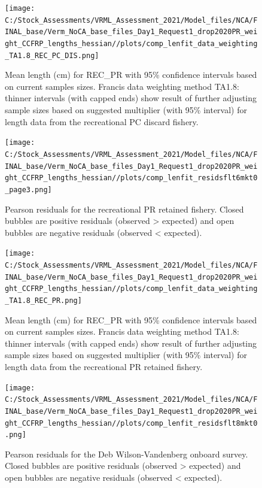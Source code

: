 \documentclass[11pt,
  english,
]{article}
\begin{document}
\begin{figure}
\centering
\texttt{[image: C:/Stock\_Assessments/VRML\_Assessment\_2021/Model\_files/NCA/FINAL\_base/Verm\_NoCA\_base\_files\_Day1\_Request1\_drop2020PR\_weight\_CCFRP\_lengths\_hessian//plots/comp\_lenfit\_data\_weighting\_TA1.8\_REC\_PC\_DIS.png]}
\caption{Mean length (cm) for REC\_PR with 95\% confidence intervals based on current samples sizes. Francis data weighting method TA1.8: thinner intervals (with capped ends) show result of further adjusting sample sizes based on suggested multiplier (with 95\% interval) for length data from the recreational PC discard fishery.\label{fig:mean-len-fit-REC-PC-DIS}}
\end{figure}

\begin{figure}
\centering
\texttt{[image: C:/Stock\_Assessments/VRML\_Assessment\_2021/Model\_files/NCA/FINAL\_base/Verm\_NoCA\_base\_files\_Day1\_Request1\_drop2020PR\_weight\_CCFRP\_lengths\_hessian//plots/comp\_lenfit\_residsflt6mkt0\_page3.png]}
\caption{Pearson residuals for the recreational PR retained fishery. Closed bubbles are positive residuals (observed \textgreater{} expected) and open bubbles are negative residuals (observed \textless{} expected).\label{fig:len-pearson-REC-PR}}
\end{figure}

\begin{figure}
\centering
\texttt{[image: C:/Stock\_Assessments/VRML\_Assessment\_2021/Model\_files/NCA/FINAL\_base/Verm\_NoCA\_base\_files\_Day1\_Request1\_drop2020PR\_weight\_CCFRP\_lengths\_hessian//plots/comp\_lenfit\_data\_weighting\_TA1.8\_REC\_PR.png]}
\caption{Mean length (cm) for REC\_PR with 95\% confidence intervals based on current samples sizes. Francis data weighting method TA1.8: thinner intervals (with capped ends) show result of further adjusting sample sizes based on suggested multiplier (with 95\% interval) for length data from the recreational PR retained fishery.\label{fig:mean-len-fit-REC-PR}}
\end{figure}

\begin{figure}
\centering
\texttt{[image: C:/Stock\_Assessments/VRML\_Assessment\_2021/Model\_files/NCA/FINAL\_base/Verm\_NoCA\_base\_files\_Day1\_Request1\_drop2020PR\_weight\_CCFRP\_lengths\_hessian//plots/comp\_lenfit\_residsflt8mkt0.png]}
\caption{Pearson residuals for the Deb Wilson-Vandenberg onboard survey. Closed bubbles are positive residuals (observed \textgreater{} expected) and open bubbles are negative residuals (observed \textless{} expected).\label{fig:len-pearson-DWV-ONBOARD}}
\end{figure}
\end{document}
